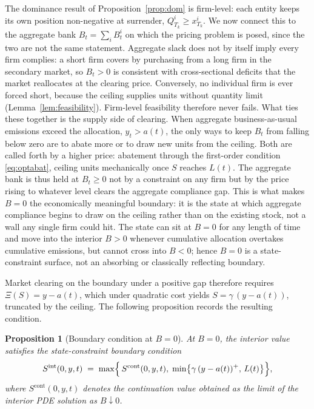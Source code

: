 \documentclass[11pt,letterpaper]{article}
\theoremstyle{plain}
\newtheorem{proposition}[theorem]{Proposition}
\theoremstyle{definition}
\numberwithin{equation}{section}
\begin{document}
The dominance result of Proposition~\ref{prop:dom} is firm-level: each entity keeps its own position non-negative at surrender, $Q^i_{T_k}\ge x^i_{T_k}$. We now connect this to the aggregate bank $B_t=\sum_i B^i_t$ on which the pricing problem is posed, since the two are not the same statement. Aggregate slack does not by itself imply every firm complies: a short firm covers by purchasing from a long firm in the secondary market, so $B_t>0$ is consistent with cross-sectional deficits that the market reallocates at the clearing price. Conversely, no individual firm is ever forced short, because the ceiling supplies units without quantity limit (Lemma~\ref{lem:feasibility}). Firm-level feasibility therefore never fails. What ties these together is the supply side of clearing. When aggregate business-as-usual emissions exceed the allocation, $y_t>a(t)$, the only ways to keep $B_t$ from falling below zero are to abate more or to draw new units from the ceiling. Both are called forth by a higher price: abatement through the first-order condition \eqref{eq:optabat}, ceiling units mechanically once $S$ reaches $L(t)$. The aggregate bank is thus held at $B_t\ge 0$ not by a constraint on any firm but by the price rising to whatever level clears the aggregate compliance gap. This is what makes $B=0$ the economically meaningful boundary: it is the state at which aggregate
compliance begins to draw on the ceiling rather than on the existing stock, not a wall any single firm could hit. The state can sit at $B=0$ for any length of time and move into the interior $B>0$ whenever cumulative allocation overtakes cumulative emissions, but cannot cross into $B<0$; hence $B=0$ is a state-constraint surface, not an
absorbing or classically reflecting boundary.

Market clearing on the boundary under a positive gap therefore requires $\Xi(S)=y-a(t)$, which under quadratic cost yields $S=\gamma\,(y-a(t))$, truncated by the ceiling. The following proposition records the resulting condition.

\begin{proposition}[Boundary condition at $B=0$]\label{prop:boundary}
At $B = 0$, the interior value satisfies the state-constraint boundary condition
\begin{equation}\label{eq:boundary}
  S^{\mathrm{int}}(0,y,t) \;=\; \max\Bigl\{\,S^{\mathrm{cont}}(0,y,t),\;
  \min\bigl\{\gamma\,(y - a(t))^{+},\, L(t)\bigr\}\Bigr\},
\end{equation}
where $S^{\mathrm{cont}}(0,y,t)$ denotes the continuation value obtained as the limit of the interior PDE solution as $B \downarrow 0$.
\end{proposition}
\end{document}
